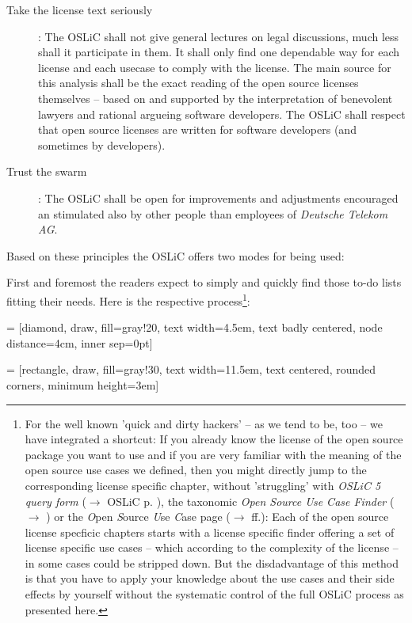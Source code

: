 \begin{description}
  \item[Take the license text seriously]: The OSLiC shall not give general
  lectures on legal discussions, much less shall it participate in them. It
  shall only find one dependable way for each license and each usecase to comply
  with the license. The main source for this analysis shall be the exact reading
  of the open source licenses themselves -- based on and supported by the
  interpretation of benevolent lawyers and rational argueing software
  developers. The OSLiC shall respect that open source licenses are written for
  software developers (and sometimes by developers).
  
  \item[Trust the swarm]: The OSLiC shall be open for improvements and
  adjustments encouraged an stimulated also by other people than employees of
  \emph{Deutsche Telekom AG}.
\end{description}

Based on these principles the OSLiC offers two modes for being used:

First and foremost the readers expect to simply and quickly find those to-do
lists fitting their needs. Here is the respective process\footnote{For the well
known 'quick and dirty hackers' -- as we tend to be, too -- we have integrated a
shortcut: If you already know the license of the open source package you want to
use and if you are very familiar with the meaning of the open source use cases
we defined, then you might directly jump to the corresponding license specific
chapter, without 'struggling' with \textit{OSLiC 5 query form} ($\rightarrow$
OSLiC p. \pageref{OSLiCStandardFormForGatheringInformation}), the taxonomic
\textit{Open Source Use Case Finder} ($\rightarrow$
\pageref{OSLiCUseCaseFinder}) or the \textit{O}pen \textit{S}ource \textit{U}se
\textit{C}ase page ($\rightarrow$ \pageref{OSUCList}ff.): Each of the open
source license specficic chapters starts with a license specific finder offering
a set of license specific use cases -- which according to the complexity of the
license -- in some cases could be stripped down. But the disdadvantage of this
method is that you have to apply your knowledge about the use cases and their
side effects by yourself without the systematic control of the full OSLiC
process as presented here.}:

 = [diamond, draw, fill=gray!20, 
    text width=4.5em, text badly centered, node distance=4cm, inner sep=0pt]

 = [rectangle, draw, fill=gray!30, 
    text width=11.5em, text centered, rounded corners, minimum height=3em]
 
